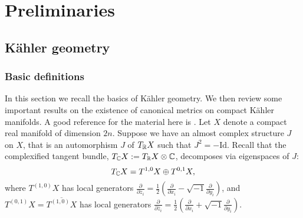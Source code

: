 \chapter{Preliminaries}
\label{chap:prelim}
\section{K\"ahler geometry}
\subsection{Basic definitions}
In this section we recall the basics of K\"ahler geometry. We then review some important results on the existence of canonical metrics on compact K\"ahler manifolds. A good reference for the material here is \cite{griffiths}. Let \(X\) denote a compact real manifold of dimension \(2n\). Suppose we have an almost complex structure \(J\) on \(X\), that is an automorphism \(J\) of \(T_{\mathbb{R}} X\) such that \(J^2 = - \text{Id}\). Recall that the complexified tangent bundle, \(T_{\mathbb{C}} X := T_{\mathbb{R}} X \otimes \mathbb{C}\), decomposes via eigenspaces of \(J\):
\[
T_{\mathbb{C}} X = T^{1,0} X \oplus T^{0,1} X,
\]
where \(T^{(1,0)} X\) has local generators \(\frac{\partial}{\partial z_i} = \frac{1}{2} \left( \frac{\partial}{\partial x_i}  - \sqrt{-1} \frac{\partial}{\partial y_i}  \right) \), and \(T^{(0,1)} X = \overline{T^{(1,0)} X}\) has local generators \(\frac{\partial}{\partial \bar{z}_i} = \frac{1}{2} \left( \frac{\partial}{\partial x_i}  + \sqrt{-1} \frac{\partial}{\partial y_i}  \right)\).

